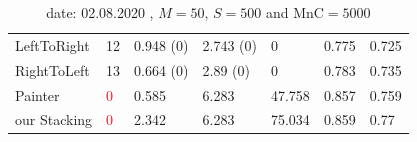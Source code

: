 \documentclass{beamer}
\newcommand{\red}{\textcolor{red}}
\begin{document}
\begin{frame}
\begin{table}[!h]
\begin{table}[!h]
\begin{center}
{\begin{tabular}{| l || p{1.3cm} | p{1.7cm} | p{1.7cm} | p{1.5cm} | p{1.5cm} | p{1.5cm} |}
      LeftToRight  & 12      & 0.948 (0)    & 2.743 (0)    & 0             & 0.775           & 0.725         \\

      RightToLeft  & 13      & 0.664 (0)    & 2.89 (0)     & 0             & 0.783           & 0.735         \\
\hline
      Painter      &\red 0       & 0.585        & 6.283        & 47.758        & 0.857           & 0.759         \\

      our Stacking &\red 0       & 2.342        & 6.283        & 75.034        & 0.859           & 0.77          \\

      \hline
    \end{tabular}}
  \end{center}
 \caption{
  date: 02.08.2020  , $M=50$, $S=500$ and $\text{MnC}=5000$ }
\end{table}
\end{table}

\end{frame}
\end{document}

